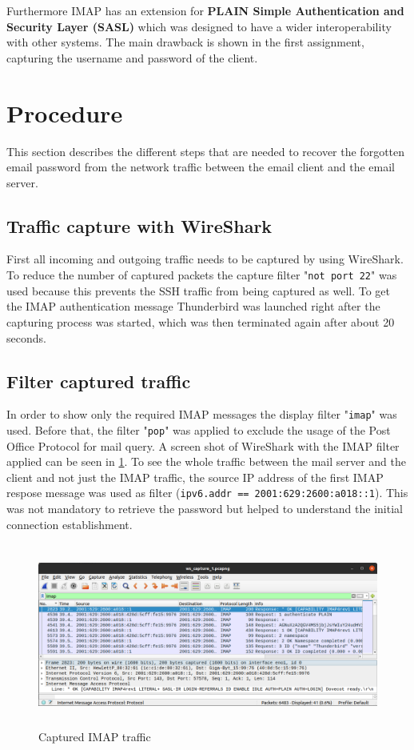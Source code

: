 \documentclass[parskip=full]{scrartcl}
\begin{document}
Furthermore IMAP has an extension for \textbf{PLAIN Simple Authentication and Security Layer (SASL)}\cite{zeilenga2006plain} which was designed to have a wider interoperability with other systems. The main drawback is shown in the first assignment, capturing the username and password of the client.

\section{Procedure} \label{sec:procedure}
This section describes the different steps that are needed to recover the forgotten email password from the network traffic between the email client and the email server. 
\subsection{Traffic capture with WireShark} \label{subsec:capture}
First all incoming and outgoing traffic needs to be captured by using WireShark. 
To reduce the number of captured packets the capture filter "\verb|not port 22|" was used because this prevents the SSH traffic from being captured as well. 
To get the IMAP authentication message Thunderbird was launched right after the capturing process was started, which was then terminated again after about 20 seconds.
\subsection{Filter captured traffic} \label{subsec:filter}
In order to show only the required IMAP messages the display filter "\verb|imap|" was used. 
Before that, the filter "\verb|pop|" was applied to exclude the usage of the Post Office Protocol for mail query. 
A screen shot of WireShark with the IMAP filter applied can be seen in \cref{fig:ws}. 
To see the whole traffic between the mail server and the client and not just the IMAP traffic, the source IP address of the first IMAP respose message was used as filter (\verb|ipv6.addr == 2001:629:2600:a018::1|).
This was not mandatory to retrieve the password but helped to understand the initial connection establishment.  

\begin{figure}[!ht]
	\centering %
	\includegraphics[height=6cm]{images/ws1.png} %
	\caption{Captured IMAP traffic} 
	\label{fig:ws} %
\end{figure} 
\end{document}
